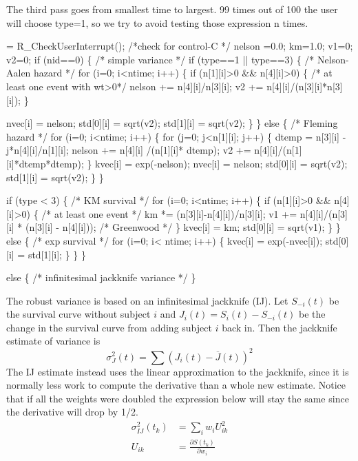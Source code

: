 \documentclass{article}
\begin{document}
The third pass goes from smallest time to largest. 99 times out of 100 the
user will choose type=1, so we try to avoid testing those
expression n times.
\begin{nwchunk}
=
 R_CheckUserInterrupt();  /*check for control-C */
 nelson =0.0; km=1.0; 
 v1=0; v2=0;
 if (nid==0) \{  /* simple variance */
    if (type==1 || type==3) \{  /* Nelson-Aalen hazard */
         for (i=0; i<ntime; i++) \{
             if (n[1][i]>0 && n[4][i]>0) \{  /* at least one event with wt>0*/
                 nelson += n[4][i]/n[3][i];
                 v2 += n[4][i]/(n[3][i]*n[3][i]);
                 \}
 
             nvec[i] = nelson;
             std[0][i] = sqrt(v2);
             std[1][i] = sqrt(v2);
             \}
    \} else \{              /* Fleming hazard */
         for (i=0; i<ntime; i++) \{
             for (j=0; j<n[1][i]; j++) \{
                 dtemp = n[3][i] - j*n[4][i]/n[1][i];
                 nelson += n[4][i] /(n[1][i]* dtemp);
                 v2 += n[4][i]/(n[1][i]*dtemp*dtemp);
             \}
             kvec[i] = exp(-nelson);
             nvec[i] = nelson;
             std[0][i] = sqrt(v2);
             std[1][i] = sqrt(v2);
         \}
     \}
 
     if (type < 3) \{  /* KM survival */
         for (i=0; i<ntime; i++) \{
             if (n[1][i]>0 && n[4][i]>0) \{  /* at least one event */
                 km *= (n[3][i]-n[4][i])/n[3][i];
                 v1 += n[4][i]/(n[3][i] * (n[3][i] - n[4][i])); /* Greenwood */
                 \}
             kvec[i] = km;
             std[0][i] = sqrt(v1);
         \}
     \} else \{  /* exp survival */
         for (i=0; i< ntime; i++) \{
             kvec[i] = exp(-nvec[i]);
             std[0][i] = std[1][i];
         \}
     \}
 \}
 
 else \{ /* infinitesimal jackknife variance */
 \}
\end{nwchunk}

The robust variance is based on an infinitesimal jackknife (IJ).
Let $S_{-i}(t)$ be the survival curve without subject $i$ and
$J_i(t) = S_i(t) - S_{-i}(t)$ be the change in the 
survival curve from adding subject $i$ back in.
Then the jackknife estimate of variance is 
$$
    \sigma^2_J(t) = \sum \left( J_i(t) - \overline J(t) \right)^2
$$
The IJ estimate instead uses the linear approximation to the
jackknife, since it is normally less work to compute the derivative than a
whole new estimate.
Notice that if all the weights were doubled the expression below will stay
the same since the derivative will drop by 1/2.
\begin{align*}
  \sigma^2_{IJ}(t_k) & = \sum_i w_i U_{ik}^2 \\
  U_{ik}  & =  \frac{\partial S(t_k)}{\partial w_i}
\end{align*}
\end{document}
